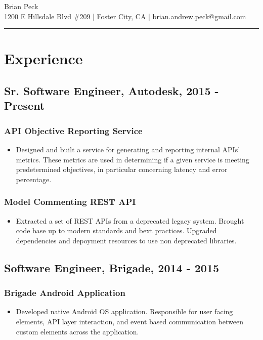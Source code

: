 \documentclass[11pt]{article}
\title{}
\date{}
\begin{document}
\begin{center}
{\huge Brian Peck} \\
1200 E Hillsdale Blvd \#209 | Foster City, CA | brian.andrew.peck@gmail.com
\hrule
\end{center}

\section*{Experience}
\label{sec-1}
\subsection*{Sr. Software Engineer, Autodesk, 2015 - Present}
\label{sec-1-1}
\subsubsection*{API Objective Reporting Service}
\label{sec-1-1-1}

\begin{itemize}
\item Designed and built a service for generating and reporting internal APIs' metrics. These metrics are used in determining if a given service is meeting predetermined objectives, in particular concerning latency and error percentage.
\end{itemize}
\subsubsection*{Model Commenting REST API}
\label{sec-1-1-2}

\begin{itemize}
\item Extracted a set of REST APIs from a deprecated legacy system. Brought code base up to modern standards and bext practices. Upgraded dependencies and depoyment resources to use non deprecated libraries.
\end{itemize}
\subsection*{Software Engineer, Brigade, 2014 - 2015}
\label{sec-1-2}
\subsubsection*{Brigade Android Application}
\label{sec-1-2-1}

\begin{itemize}
\item Developed native Android OS application. Responsible for user facing elements, API layer interaction, and event based communication between custom elements across the application.
\end{itemize}
\end{document}
